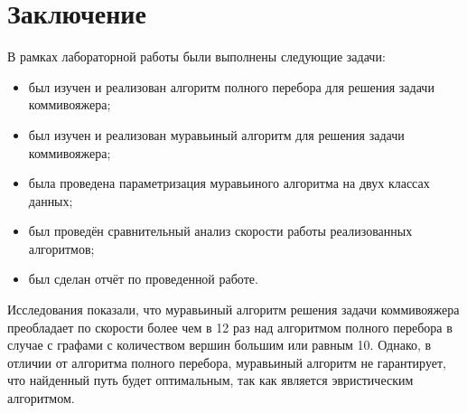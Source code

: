 \chapter*{Заключение}

В рамках лабораторной работы были выполнены следующие задачи:
\begin{itemize}
    \item был изучен и реализован алгоритм полного перебора для решения задачи коммивояжера;
    \item был изучен и реализован муравьиный алгоритм для решения задачи коммивояжера;
    \item была проведена параметризация муравьиного алгоритма на двух классах данных;
    \item был проведён сравнительный анализ скорости работы реализованных алгоритмов;
    \item был сделан отчёт по проведенной работе.
\end{itemize}

Исследования показали, что муравьиный алгоритм решения задачи коммивояжера преобладает по скорости более чем в 12 раз над алгоритмом полного перебора в случае с графами с количеством вершин большим или равным 10.
Однако, в отличии от алгоритма полного перебора, муравьиный алгоритм не гарантирует, что найденный путь будет оптимальным, так как является эвристическим алгоритмом.
